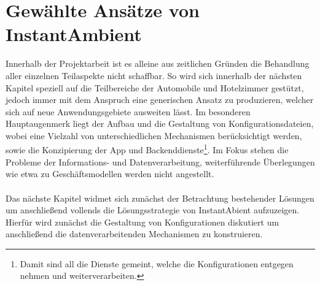 \section{Gewählte Ansätze von InstantAmbient}
Innerhalb der Projektarbeit ist es alleine aus zeitlichen Gründen die Behandlung aller einzelnen Teilaspekte nicht schaffbar. So wird sich innerhalb der nächsten Kapitel 
speziell auf die Teilbereiche der Automobile und Hotelzimmer gestützt, jedoch immer mit dem Anspruch eine generischen Ansatz zu produzieren, welcher sich auf neue 
Anwendungsgebiete ausweiten lässt. Im besonderen Hauptaugenmerk liegt der Aufbau und die Gestaltung von Konfigurationsdateien, wobei eine Vielzahl von unterschiedlichen 
Mechanismen berücksichtigt werden, sowie die Konzipierung der App und Backenddienste\footnote{Damit sind all die Dienste gemeint, welche die Konfigurationen entgegen nehmen 
und weiterverarbeiten.}. Im Fokus stehen die Probleme der Informations- und Datenverarbeitung, weiterführende Überlegungen wie etwa zu Geschäftsmodellen werden nicht 
angestellt. 
\\\\
Das nächste Kapitel widmet sich zunächst der Betrachtung bestehender Lösungen um anschließend vollends die Lösungsstrategie von InstantAbient aufzuzeigen. Hierfür wird 
zunächst die Gestaltung von Konfigurationen diskutiert um anschließend die datenverarbeitenden Mechanismen zu konstruieren. 


